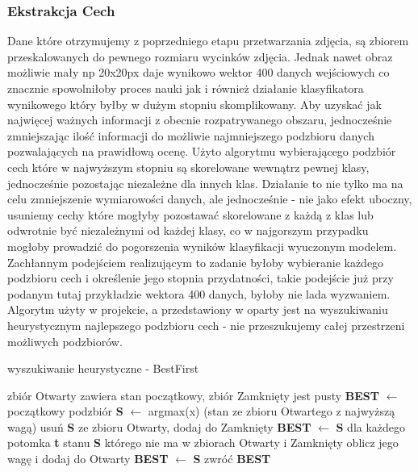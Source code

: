 \documentclass{classrep}
\begin{document}
\subsubsection{Ekstrakcja Cech} 
\label{cfseval}
Dane które otrzymujemy z poprzedniego etapu przetwarzania zdjęcia, są zbiorem przeskalowanych do pewnego rozmiaru wycinków zdjęcia. Jednak nawet obraz możliwie mały np 20x20px daje wynikowo wektor 400 danych wejściowych co znacznie spowolniłoby proces nauki jak i również działanie klasyfikatora wynikowego który byłby w dużym stopniu skomplikowany. Aby uzyskać jak najwięcej ważnych informacji z obecnie rozpatrywanego obszaru, jednocześnie  zmniejszając ilość informacji do możliwie najmniejszego podzbioru danych pozwalających na prawidłową ocenę. Użyto algorytmu wybierającego podzbiór cech które w najwyższym stopniu są skorelowane wewnątrz pewnej klasy, jednocześnie pozostając niezależne dla innych klas. Działanie to nie tylko ma na celu zmniejszenie wymiarowości danych, ale jednocześnie - nie jako efekt uboczny, usuniemy cechy które mogłyby pozostawać skorelowane z każdą z klas lub odwrotnie być niezależnymi od każdej klasy,  co w najgorszym przypadku mogłoby prowadzić do pogorszenia wyników klasyfikacji wyuczonym modelem.\\
Zachłannym podejściem realizującym to zadanie byłoby wybieranie każdego podzbioru cech i określenie jego stopnia przydatności, takie podejście już przy podanym tutaj przykładzie wektora 400 danych, byłoby nie lada wyzwaniem.\\ 
Algorytm użyty w projekcie, a przedstawiony w \cite{Hall1998} oparty jest na wyszukiwaniu heurystycznym najlepszego podzbioru cech - nie przeszukujemy całej przestrzeni możliwych podzbiorów. 
\begin{algorithm}
\caption{wyszukiwanie heurystyczne - BestFirst}
\label{bestfirst}
\begin{algorithmic}[1]
\STATE zbiór Otwarty zawiera stan początkowy, zbiór Zamknięty jest pusty
\STATE \textbf{BEST} $\leftarrow$ początkowy podzbiór
\STATE \textbf{S} $\leftarrow$ argmax(x) (stan ze zbioru Otwartego z najwyższą wagą)
\STATE usuń \textbf{S} ze zbioru Otwarty, dodaj do Zamknięty
\STATE \textbf{BEST} $\leftarrow$ \textbf{S}
\ENDIF
\STATE dla każdego potomka \textbf{t} stanu \textbf{S} którego nie ma w zbiorach Otwarty i Zamknięty oblicz jego wagę i dodaj do Otwarty
\STATE \textbf{BEST} $\leftarrow$ \textbf{S}
\ELSE
\STATE zwróć \textbf{BEST}
\ENDIF
\end{algorithmic}
\end{algorithm}
\end{document}
